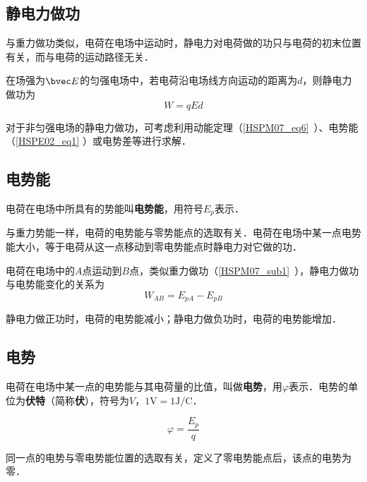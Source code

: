 

\subsection{静电力做功}

与重力做功类似，电荷在电场中运动时，静电力对电荷做的功只与电荷的初末位置有关，而与电荷的运动路径无关．

在场强为$\bvec E$的匀强电场中，若电荷沿电场线方向运动的距离为$d$，则静电力做功为
\begin{equation}\label{HSPE02_eq4}
W=qEd
\end{equation}

对于非匀强电场的静电力做功，可考虑利用动能定理（\autoref{HSPM07_eq6}~）、电势能（\autoref{HSPE02_eq1} ）或电势差等进行求解．

\subsection{电势能}

电荷在电场中所具有的势能叫\textbf{电势能}，用符号$E_p$表示．

与重力势能一样，电荷的电势能与零势能点的选取有关．电荷在电场中某一点电势能大小，等于电荷从这一点移动到零电势能点时静电力对它做的功．

电荷在电场中的$A$点运动到$B$点，类似重力做功（\autoref{HSPM07_sub1}~），静电力做功与电势能变化的关系为
\begin{equation}\label{HSPE02_eq1}
W_{AB}=E_{pA}-E_{pB}
\end{equation}

静电力做正功时，电荷的电势能减小；静电力做负功时，电荷的电势能增加．

\subsection{电势}

电荷在电场中某一点的电势能与其电荷量的比值，叫做\textbf{电势}，用$\varphi$表示．电势的单位为\textbf{伏特}（简称\textbf{伏}），符号为$V$，$1\mathrm{V}=1\mathrm{J/C}$．

\begin{equation}\label{HSPE02_eq2}
\varphi = \frac{E_p}{q}
\end{equation}

同一点的电势与零电势能位置的选取有关，定义了零电势能点后，该点的电势为零．

